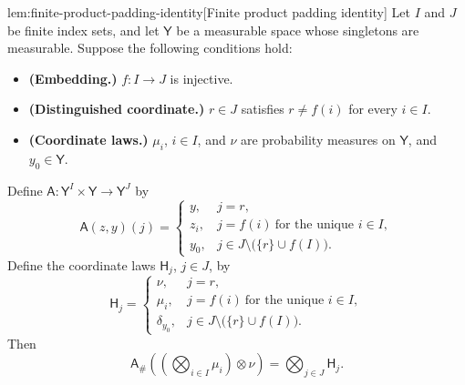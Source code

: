 \documentclass[11pt]{article}
\begin{document}
\begin{lemmav}{lem:finite-product-padding-identity}[Finite product padding identity]
Let \(I\) and \(J\) be finite index sets, and let \(\mathsf Y\) be a measurable space whose singletons are measurable. Suppose the following conditions hold:
\begin{itemize}
\item \textbf{(Embedding.)} \(f:I\to J\) is injective.
\item \textbf{(Distinguished coordinate.)} \(r\in J\) satisfies \(r\ne f(i)\) for every \(i\in I\).
\item \textbf{(Coordinate laws.)} \(\mu_i\), \(i\in I\), and \(\nu\) are probability measures on \(\mathsf Y\), and \(y_0\in\mathsf Y\).
\end{itemize}
Define \(\mathsf A:\mathsf Y^I\times\mathsf Y\to\mathsf Y^J\) by
\[
\mathsf A(z,y)(j)=
\begin{cases}
y, & j=r,\\
z_i, & j=f(i)\ \text{for the unique } i\in I,\\
y_0, & j\in J\setminus\bigl(\{r\}\cup f(I)\bigr).
\end{cases}
\]
Define the coordinate laws \(\mathsf H_j\), \(j\in J\), by
\[
\mathsf H_j=
\begin{cases}
\nu, & j=r,\\
\mu_i, & j=f(i)\ \text{for the unique } i\in I,\\
\delta_{y_0}, & j\in J\setminus\bigl(\{r\}\cup f(I)\bigr).
\end{cases}
\]
Then
\[
\mathsf A_\#\left(\left(\bigotimes_{i\in I}\mu_i\right)\otimes\nu\right)
=
\bigotimes_{j\in J}\mathsf H_j .
\]
\end{lemmav}
\end{document}
